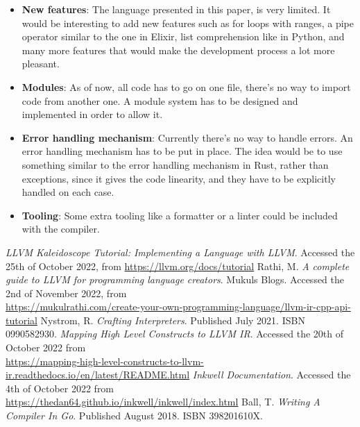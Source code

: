 ﻿\documentclass[10pt,a4paper,twocolumn,twoside]{article}
\begin{document}
\begin{itemize}
    \item \textbf{New features}: The language presented in this paper, is very
        limited. It would be interesting to add new features such as for loops
        with ranges, a pipe operator similar to the one in Elixir, list 
        comprehension like in Python, and many more features that would make 
        the development process a lot more pleasant.
    \item \textbf{Modules}: As of now, all code has to go on one file, there's
        no way to import code from another one. A module system has to be 
        designed and implemented in order to allow it.
    \item \textbf{Error handling mechanism}: Currently there's no way to handle
        errors. An error handling mechanism has to be put in place. The idea
        would be to use something similar to the error handling mechanism in 
        Rust, rather than exceptions, since it gives the code linearity, and 
        they have to be explicitly handled on each case.
    \item \textbf{Tooling}: Some extra tooling like a formatter or a linter
        could be included with the compiler.
\end{itemize}

\begin{thebibliography}{11}

 \textit{LLVM Kaleidoscope Tutorial: Implementing a Language with LLVM}. Accessed the 25th of October 2022, from \url{https://llvm.org/docs/tutorial}
 Rathi, M. \textit{A complete guide to LLVM for programming language creators}. Mukuls Blogs. Accessed the 2nd of November 2022, from \\\url{https://mukulrathi.com/create-your-own-programming-language/llvm-ir-cpp-api-tutorial}
 Nystrom, R. \textit{Crafting Interpreters}. Published July 2021. ISBN 0990582930.
 \textit{Mapping High Level Constructs to LLVM IR}. Accessed the 20th of October 2022 from \\\url{https://mapping-high-level-constructs-to-llvm-ir.readthedocs.io/en/latest/README.html}
 \textit{Inkwell Documentation}. Accessed the 4th of October 2022 from \\\url{https://thedan64.github.io/inkwell/inkwell/index.html}
 Ball, T. \textit{Writing A Compiler In Go}. Published August 2018. ISBN 398201610X.

\end{thebibliography}
\end{document}

